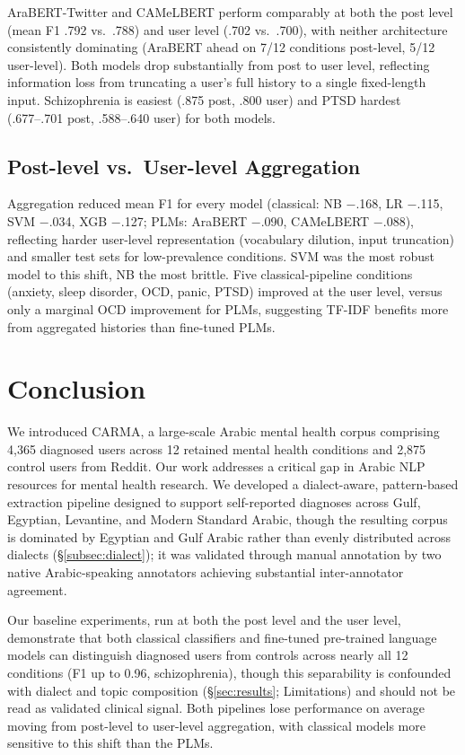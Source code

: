 \documentclass[11pt]{article}
\begin{document}
AraBERT-Twitter and CAMeLBERT perform comparably at both the post level (mean F1 .792 vs.\ .788) and user level (.702 vs.\ .700), with neither architecture consistently dominating (AraBERT ahead on 7/12 conditions post-level, 5/12 user-level). Both models drop substantially from post to user level, reflecting information loss from truncating a user's full history to a single fixed-length input. Schizophrenia is easiest (.875 post, .800 user) and PTSD hardest (.677--.701 post, .588--.640 user) for both models.

\subsection{Post-level vs.\ User-level Aggregation}

Aggregation reduced mean F1 for every model (classical: NB $-$.168, LR $-$.115, SVM $-$.034, XGB $-$.127; PLMs: AraBERT $-$.090, CAMeLBERT $-$.088), reflecting harder user-level representation (vocabulary dilution, input truncation) and smaller test sets for low-prevalence conditions. SVM was the most robust model to this shift, NB the most brittle. Five classical-pipeline conditions (anxiety, sleep disorder, OCD, panic, PTSD) improved at the user level, versus only a marginal OCD improvement for PLMs, suggesting TF-IDF benefits more from aggregated histories than fine-tuned PLMs.


\section{Conclusion}
We introduced CARMA, a large-scale Arabic mental health corpus comprising 4,365 diagnosed users across 12 retained mental health conditions and 2,875 control users from Reddit. Our work addresses a critical gap in Arabic NLP resources for mental health research. We developed a dialect-aware, pattern-based extraction pipeline designed to support self-reported diagnoses across Gulf, Egyptian, Levantine, and Modern Standard Arabic, though the resulting corpus is dominated by Egyptian and Gulf Arabic rather than evenly distributed across dialects (§\ref{subsec:dialect}); it was validated through manual annotation by two native Arabic-speaking annotators achieving substantial inter-annotator agreement.

Our baseline experiments, run at both the post level and the user level, demonstrate that both classical classifiers and fine-tuned pre-trained language models can distinguish diagnosed users from controls across nearly all 12 conditions (F1 up to 0.96, schizophrenia), though this separability is confounded with dialect and topic composition (§\ref{sec:results}; Limitations) and should not be read as validated clinical signal. Both pipelines lose performance on average moving from post-level to user-level aggregation, with classical models more sensitive to this shift than the PLMs.
\end{document}
